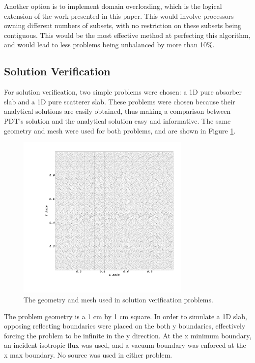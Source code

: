 \documentclass{anstrans}
\begin{document}
Another option is to implement domain overloading\cite{mpadams2015}, which is the logical extension of the work presented in this paper. This would involve processors owning different numbers of subsets, with no restriction on these subsets being contiguous. This would be the most effective method at perfecting this algorithm, and would lead to less problems being unbalanced by more than 10\%.

\subsection{Solution Verification}

For solution verification, two simple problems were chosen: a 1D pure absorber slab and a 1D pure scatterer slab. These problems were chosen because their analytical solutions are easily obtained, thus making a comparison between PDT's solution and the analytical solution easy and informative. The same geometry and mesh were used for both problems, and are shown in Figure \ref{verificationgeometry}.

\begin{figure}
\centering
\includegraphics[width=85mm,trim = 10cm 10cm 0cm 0cm ]{figures/solutionmesh.png}
\caption{The geometry and mesh used in solution verification problems.}
\label{verificationgeometry}
\end{figure}

The problem geometry is a 1 cm by 1 cm square. In order to simulate a 1D slab, opposing reflecting boundaries were placed on the both y boundaries, effectively forcing the problem to be infinite in the y direction. At the x minimum boundary, an incident isotropic flux was used, and a vacuum boundary was enforced at the x max boundary. No source was used in either problem.
\end{document}

